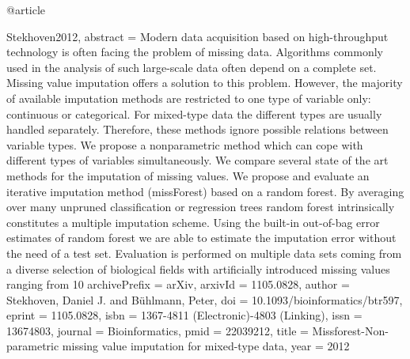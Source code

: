 {{@article{Stekhoven2012,
abstract = {Modern data acquisition based on high-throughput technology is often facing the problem of missing data. Algorithms commonly used in the analysis of such large-scale data often depend on a complete set. Missing value imputation offers a solution to this problem. However, the majority of available imputation methods are restricted to one type of variable only: continuous or categorical. For mixed-type data the different types are usually handled separately. Therefore, these methods ignore possible relations between variable types. We propose a nonparametric method which can cope with different types of variables simultaneously. We compare several state of the art methods for the imputation of missing values. We propose and evaluate an iterative imputation method (missForest) based on a random forest. By averaging over many unpruned classification or regression trees random forest intrinsically constitutes a multiple imputation scheme. Using the built-in out-of-bag error estimates of random forest we are able to estimate the imputation error without the need of a test set. Evaluation is performed on multiple data sets coming from a diverse selection of biological fields with artificially introduced missing values ranging from 10%
archivePrefix = {arXiv},
arxivId = {1105.0828},
author = {Stekhoven, Daniel J. and B{\"{u}}hlmann, Peter},
doi = {10.1093/bioinformatics/btr597},
eprint = {1105.0828},
isbn = {1367-4811 (Electronic)-4803 (Linking)},
issn = {13674803},
journal = {Bioinformatics},
pmid = {22039212},
title = {{Missforest-Non-parametric missing value imputation for mixed-type data}},
year = {2012}
}

}}}
